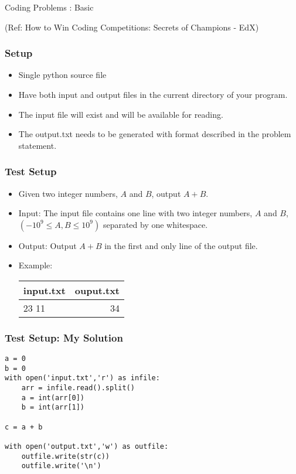 \begin{frame}[fragile]\frametitle{}
\begin{center}
{\Large Coding Problems : Basic}
\end{center}

{\tiny (Ref: How to Win Coding Competitions: Secrets of Champions - EdX)}
\end{frame}

\begin{frame}[fragile]\frametitle{Setup}
\begin{itemize}
\item Single python source file
\item Have both input and output files in the current directory of your program.
\item The input file will exist and will be available for reading.
\item The output.txt needs to be generated with format described in the problem statement.
\end{itemize}
\end{frame}

\begin{frame}[fragile]\frametitle{Test Setup}
\begin{itemize}
\item Given two integer numbers, $A$  and $B$, output $A+B$.
\item Input: The input file contains one line with two integer numbers, $A$ and $B$, $(-10^9 \le A,B \le 10^9)$ separated by one whitespace.
\item Output: Output $A+B$  in the first and only line of the output file.
\item Example:

\begin{table}[h!]
    \begin{tabular}{|l|r|}
	\hline
      input.txt & ouput.txt\\
      \hline
      23 11 & 34\\
	  \hline
    \end{tabular}
\end{table}
\end{itemize}
\end{frame}

\begin{frame}[fragile]\frametitle{Test Setup: My Solution}
\begin{lstlisting}
a = 0
b = 0
with open('input.txt','r') as infile:
	arr = infile.read().split()
	a = int(arr[0])
	b = int(arr[1])
	
c = a + b

with open('output.txt','w') as outfile:
	outfile.write(str(c))
	outfile.write('\n')
\end{lstlisting}
\end{frame}

